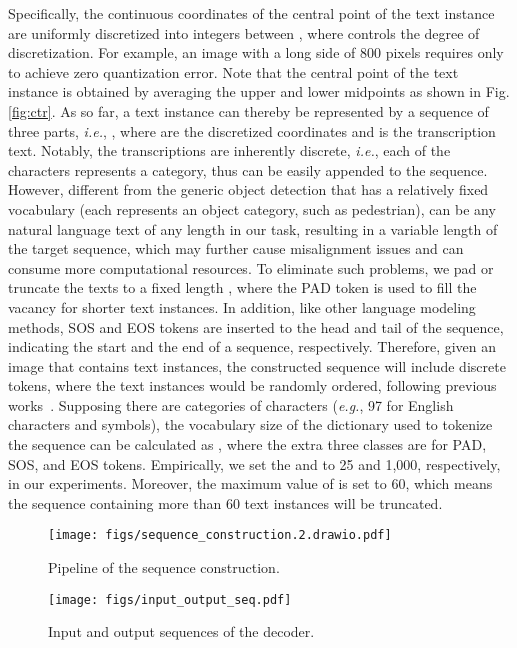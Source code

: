 \documentclass[sigconf]{acmart}
\begin{document}
Specifically, the continuous coordinates of the central point of the text instance are uniformly discretized into integers between , where  controls the degree of discretization. For example, an image with a long side of 800 pixels requires only  to achieve zero quantization error. Note that the central point of the text instance is obtained by averaging the upper and lower midpoints as shown in Fig. \ref{fig:ctr}. As so far, a text instance can thereby be represented by a sequence of three parts, \emph{i.e.}, , where  are the discretized coordinates and  is the transcription text. Notably, the transcriptions are inherently discrete, \emph{i.e.}, each of the characters represents a category, thus can be easily appended to the sequence. However, different from the generic object detection that has a relatively fixed vocabulary (each  represents an object category, such as pedestrian),  can be any natural language text of any length in our task, resulting in a variable length of the target sequence, which may further cause misalignment issues and can consume more computational resources. To eliminate such problems, we pad or truncate the texts to a fixed length , where the PAD token is used to fill the vacancy for shorter text instances. In addition, like other language modeling methods, SOS and EOS tokens are inserted to the head and tail of the sequence, indicating the start and the end of a sequence, respectively. Therefore, given an image that contains  text instances, the constructed sequence will include  discrete tokens, where the text instances would be randomly ordered, following previous works~\cite{chen2021pix2seq}. Supposing there are  categories of characters (\emph{e.g.}, 97 for English characters and symbols), the vocabulary size of the dictionary used to tokenize the sequence can be calculated as , where the extra three classes are for PAD, SOS, and EOS tokens. Empirically, we set the  and  to 25 and 1,000, respectively, in our experiments. Moreover, the maximum value of  is set to 60, which means the sequence containing more than 60 text instances will be truncated.


\begin{figure}[t!]
    \centering
    \texttt{[image: figs/sequence\_construction.2.drawio.pdf]}
    \caption{Pipeline of the sequence construction.}
    \label{fig:seq_constrcut}
\end{figure}

\begin{figure}[t!]
    \centering
    \texttt{[image: figs/input\_output\_seq.pdf]}
    \caption{Input and output sequences of the decoder.}
    \label{fig:input_output_seq}
\end{figure}
\end{document}
